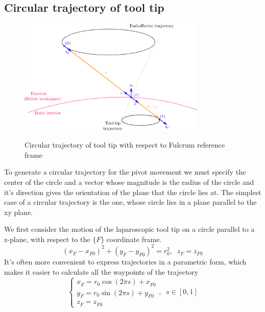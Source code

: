 \subsection{Circular trajectory of tool tip}

\begin{center}
\begin{figure}[htbp]
\centering
\includegraphics[width=0.8\textwidth]{images/circular-trajectory-wrt-fulcrum.png}\\
\caption{Circular trajectory of tool tip with respect to Fulcrum reference frame}
\end{figure}
\end{center}

To generate a circular trajectory for the pivot movement we must specify the center of the circle 
and a vector whose magnitude is the radius of the circle and it’s direction gives the orientation 
of the plane that the circle lies at. The simplest case of a circular trajectory is the one, 
whose circle lies in a plane parallel to the xy plane.


We first consider the motion of the laparoscopic tool tip on a circle parallel to a z-plane, with respect to the $\lbrace F \rbrace$ coordinate frame.
\begin{equation}
(x^{}_{F} - x^{}_{F0})^2 + (y^{}_{F} - y^{}_{F0})^2 = r_0^2, \;\; z^{}_{F} = z^{}_{F0}
\end{equation}
It's often more convenient to express trajectories in a parametric form, which makes it easier to calculate all the waypoints of the trajectory
\begin{equation}
\label{circle-z-plane-traj}
\begin{cases}
x^{}_{F} = r_0\cos(2πs) + x^{}_{F0} \\
y^{}_{F} = r_0\sin(2πs) + y^{}_{F0} \\
z^{}_{F} = z^{}_{F0}
\end{cases} ,
\;\;
s \in [0, 1]
\end{equation}

